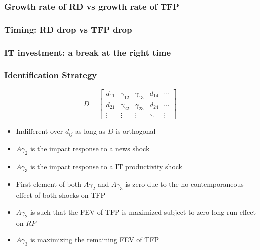 \documentclass{beamer}
\begin{document}
\begin{frame}
	\frametitle{Growth rate of RD vs growth rate of TFP}
	\label{growth_rates}

	
\hyperlink{convincing}{}	
\end{frame}

\begin{frame}
	\frametitle{Timing: RD drop vs TFP drop}
	\label{timing}

	
\hyperlink{convincing}{}	
\end{frame}

\begin{frame}
	\frametitle{IT investment: a break at the right time}
	\label{it_investment}

	
\hyperlink{convincing}{}	
\end{frame}

\begin{frame}
\frametitle{Identification Strategy}
\label{Technicalities}

\begin{equation}
D = \begin{bmatrix}
d_{11} & \gamma_{12} & \gamma_{13} & d_{14} & \cdots \\
d_{21} & \gamma_{22} & \gamma_{23} & d_{24} & \cdots \\
\vdots & \vdots & \vdots & \ddots & \vdots 
\end{bmatrix}
\end{equation}

\begin{itemize}
	\item Indifferent over $d_{ij}$ as long as $D$ is orthogonal
	\item $A \gamma_{2}$ is the impact response to a news shock
	\item $A \gamma_{3}$ is the impact response to a IT productivity shock
	\item First element of both $A \gamma_{2}$ and $A \gamma_{3}$ is zero due to the no-contemporaneous effect of both shocks on TFP
	\item $A \gamma_2$ is such that the FEV of TFP is maximized subject to zero long-run effect on $RP$
	\item $A \gamma_3$ is maximizing the remaining FEV of TFP 
\end{itemize} 


\hyperlink{identification}{}	
\end{frame}
	
	
\end{document}
